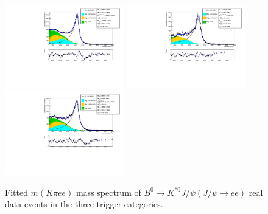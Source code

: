\begin{figure}[h!]
\centering
\includegraphics[width=0.46\textwidth]{RKst/figs/fit_EEs_0_EE-q2central-gmc/KstJPsEE_L0E_fitAndRes.pdf}
\includegraphics[width=0.46\textwidth]{RKst/figs/fit_EEs_0_EE-q2central-gmc/KstJPsEE_L0H_fitAndRes.pdf}
\includegraphics[width=0.46\textwidth]{RKst/figs/fit_EEs_0_EE-q2central-gmc/KstJPsEE_L0I_fitAndRes.pdf}
\caption{Fitted $m(K\pi ee)$ mass spectrum of $B^0 \rightarrow K^{*0} J/\psi(J/\psi\rightarrow ee)$
real data events in the three trigger categories. }
\label{fig:FitJpsiEE_Data_inTrigCat}
\end{figure}
%
